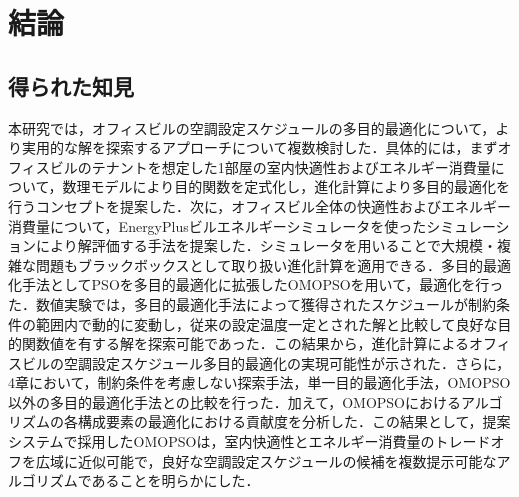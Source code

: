 \chapter{結論}
\label{chap::conclusion}
\section{得られた知見}

\hspace{1zw}

本研究では，オフィスビルの空調設定スケジュールの多目的最適化について，より実用的な解を探索するアプローチについて複数検討した．具体的には，まずオフィスビルのテナントを想定した1部屋の室内快適性およびエネルギー消費量について，数理モデルにより目的関数を定式化し，進化計算により多目的最適化を行うコンセプトを提案した．次に，オフィスビル全体の快適性およびエネルギー消費量について，EnergyPlusビルエネルギーシミュレータを使ったシミュレーションにより解評価する手法を提案した．シミュレータを用いることで大規模・複雑な問題もブラックボックスとして取り扱い進化計算を適用できる．多目的最適化手法としてPSOを多目的最適化に拡張したOMOPSOを用いて，最適化を行った．数値実験では，多目的最適化手法によって獲得されたスケジュールが制約条件の範囲内で動的に変動し，従来の設定温度一定とされた解と比較して良好な目的関数値を有する解を探索可能であった．この結果から，進化計算によるオフィスビルの空調設定スケジュール多目的最適化の実現可能性が示された．さらに，4章において，制約条件を考慮しない探索手法，単一目的最適化手法，OMOPSO以外の多目的最適化手法との比較を行った．加えて，OMOPSOにおけるアルゴリズムの各構成要素の最適化における貢献度を分析した．この結果として，提案システムで採用したOMOPSOは，室内快適性とエネルギー消費量のトレードオフを広域に近似可能で，良好な空調設定スケジュールの候補を複数提示可能なアルゴリズムであることを明らかにした．

